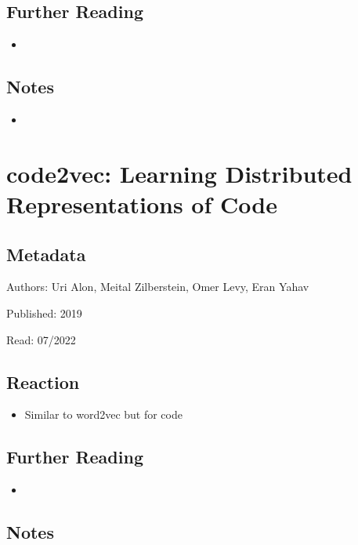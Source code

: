 \documentclass{article}
\begin{document}
\subsection*{Further Reading}
\begin{itemize}
	\item
\end{itemize}

\subsection*{Notes}

\begin{itemize}
	\item
\end{itemize}

\pagebreak


\section*{code2vec: Learning Distributed Representations of Code}

\subsection*{Metadata}

\noindent Authors: Uri Alon, Meital Zilberstein, Omer Levy, Eran Yahav

\noindent Published: 2019

\noindent Read: 07/2022

\subsection*{Reaction}
\begin{itemize}
\item Similar to word2vec but for code
\end{itemize}

\subsection*{Further Reading}
\begin{itemize}
	\item
\end{itemize}

\subsection*{Notes}
\end{document}
